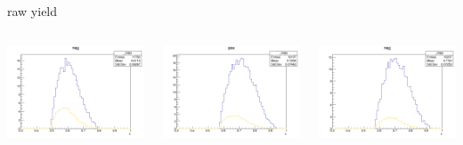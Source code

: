 \begin{frame}{raw yield}
\begin{columns}
\begin{column}[T]{0.25\textwidth}
\includegraphics[width = \textwidth]{results/yield/statistics/yield_x_Q2_z_0.45_3.898_0.60_neg.png}
\end{column}
\begin{column}[T]{0.25\textwidth}
\includegraphics[width = \textwidth]{results/yield/statistics/yield_x_Q2_z_0.45_3.898_0.70_pos.png}
\end{column}
\begin{column}[T]{0.25\textwidth}
\includegraphics[width = \textwidth]{results/yield/statistics/yield_x_Q2_z_0.45_3.898_0.70_neg.png}
\end{column}
\end{columns}
\end{frame}

